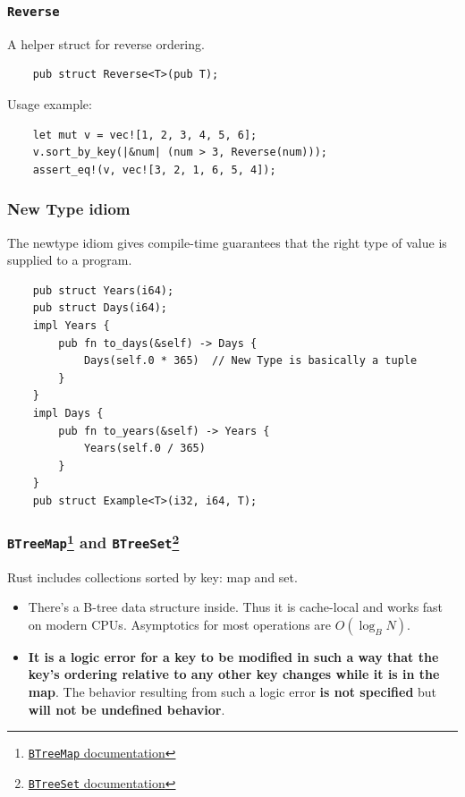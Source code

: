\documentclass[aspectratio=1610,t]{beamer}
\begin{document}

\begin{frame}[fragile]
\frametitle{\texttt{Reverse}}
A helper struct for reverse ordering.

\begin{verbatim}
    pub struct Reverse<T>(pub T);
\end{verbatim}

Usage example:

\begin{verbatim}
    let mut v = vec![1, 2, 3, 4, 5, 6];
    v.sort_by_key(|&num| (num > 3, Reverse(num)));
    assert_eq!(v, vec![3, 2, 1, 6, 5, 4]);
\end{verbatim}
\end{frame}


\begin{frame}[fragile]
\frametitle{New Type idiom}
The newtype idiom gives compile-time guarantees that the right type of value is supplied to a program.

\begin{verbatim}
    pub struct Years(i64);
    pub struct Days(i64);
    impl Years {
        pub fn to_days(&self) -> Days {
            Days(self.0 * 365)  // New Type is basically a tuple
        }
    }
    impl Days {
        pub fn to_years(&self) -> Years {
            Years(self.0 / 365)
        }
    }
    pub struct Example<T>(i32, i64, T);
\end{verbatim}
\end{frame}


\begin{frame}[fragile]
\frametitle{\texttt{BTreeMap}\footnote{\href{https://doc.rust-lang.org/std/collections/struct.BTreeMap.html}{\texttt{BTreeMap} documentation}} and \texttt{BTreeSet}\footnote{\href{https://doc.rust-lang.org/std/collections/struct.BTreeSet.html}{\texttt{BTreeSet} documentation}}}
Rust includes collections sorted by key: map and set.

\begin{itemize}
    \item<2-> There's a B-tree data structure inside. Thus it is cache-local and works fast on modern CPUs. Asymptotics for most operations are $O(\log_BN)$.
    \item<3-> \textbf{It is a logic error for a key to be modified in such a way that the key’s ordering relative to any other key changes while it is in the map}. The behavior resulting from such a logic error \textbf{is not specified} but \textbf{will not be undefined behavior}.
\end{itemize}
\end{frame}
\end{document}
